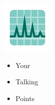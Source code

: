 \documentclass[12pt,a4paper]{article}
\begin{document}
{\begin{multicols}{2}
    \includegraphics[width=\linewidth]{icons8-ecg-96.png}
    \begin{itemize}
    \setlength\itemsep{0.1em}
        \item Your
        \item Talking
        \item Points
    \end{itemize}
    
    \end{multicols}
}
\hfill{}
\hfill
\end{document}
